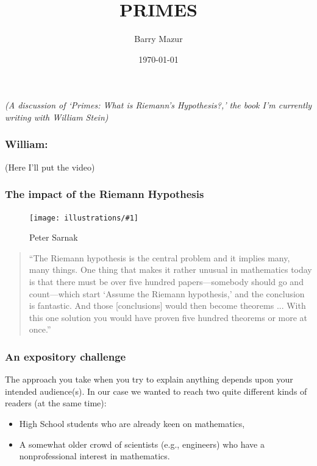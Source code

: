 \documentclass{beamer}
\title{PRIMES}
\author{Barry Mazur}
\date{\today}
\newcommand{\ill}[3]{%
   \begin{figure}[H]%
   \vspace{-2ex}
   \centering%
   \texttt{[image: illustrations/\#1]}%
   \caption{#3}%
   \vspace{-2ex}
    \end{figure}}
\begin{document}
\begin{frame}
\titlepage

{\it (A discussion of `Primes: What is Riemann's Hypothesis?,' the book I'm currently writing with William Stein)}
\end{frame}

\begin{frame}
\frametitle{William:}
 (Here I'll put the video)
\end{frame}
\begin{frame}

\frametitle{The impact of the Riemann Hypothesis}
\ill{sarnak}{0.20}{Peter Sarnak}

\begin{quote}
``The Riemann hypothesis is the central problem and it implies many,
many things. One thing that makes it rather unusual in mathematics
today is that there must be over five hundred papers---somebody should
go and count---which start `Assume the Riemann hypothesis,' and
the conclusion is fantastic. And those [conclusions] would then become
theorems ... With this one solution you would have proven five hundred
theorems or more at once.'' 
\end{quote}

\end{frame}
\begin{frame}
\frametitle{An expository challenge}
     The approach you take when you try to explain anything depends upon your intended audience(s).  In our case we wanted to reach two quite different kinds of readers (at the same time):
     \vskip20pt
     \begin{itemize} \item High School students who are already keen on mathematics,
        \vskip20pt
     \item A somewhat  older crowd of scientists (e.g., engineers)  who have a nonprofessional interest in mathematics.
     \end{itemize}
\end{frame}
\end{document}
